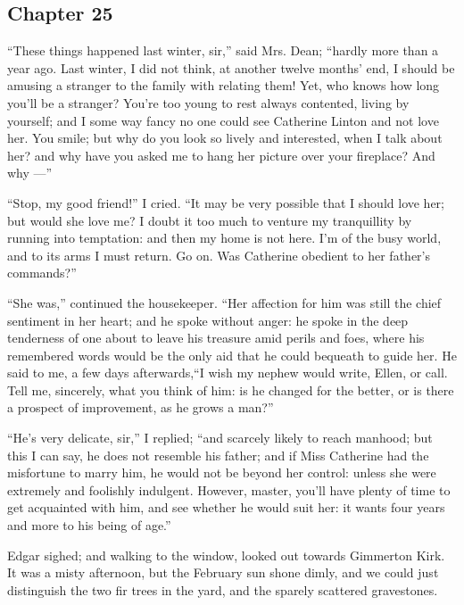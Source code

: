 \subsection*{Chapter 25}

\par “These things happened last winter, sir,” said Mrs. Dean; “hardly more than a year ago. Last winter, I did not think, at another twelve months' end, I should be amusing a stranger to the family with relating them! Yet, who knows how long you'll be a stranger? You're too young to rest always contented, living by yourself; and I some way fancy no one could see Catherine Linton and not love her. You smile; but why do you look so lively and interested, when I talk about her? and why have you asked me to hang her picture over your fireplace? And why —”
\par “Stop, my good friend!” I cried. “It may be very possible that I should love her; but would she love me? I doubt it too much to venture my tranquillity by running into temptation: and then my home is not here. I'm of the busy world, and to its arms I must return. Go on. Was Catherine obedient to her father's commands?”
\par “She was,” continued the housekeeper. “Her affection for him was still the chief sentiment in her heart; and he spoke without anger: he spoke in the deep tenderness of one about to leave his treasure amid perils and foes, where his remembered words would be the only aid that he could bequeath to guide her. He said to me, a few days afterwards,“I wish my nephew would write, Ellen, or call. Tell me, sincerely, what you think of him: is he changed for the better, or is there a prospect of improvement, as he grows a man?”
\par “He's very delicate, sir,” I replied; “and scarcely likely to reach manhood; but this I can say, he does not resemble his father; and if Miss Catherine had the misfortune to marry him, he would not be beyond her control: unless she were extremely and foolishly indulgent. However, master, you'll have plenty of time to get acquainted with him, and see whether he would suit her: it wants four years and more to his being of age.”
\par Edgar sighed; and walking to the window, looked out towards Gimmerton Kirk. It was a misty afternoon, but the February sun shone dimly, and we could just distinguish the two fir trees in the yard, and the sparely scattered gravestones.
